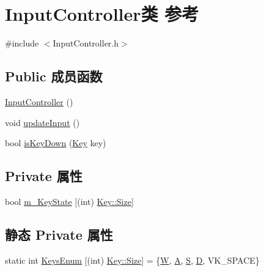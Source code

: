 \hypertarget{class_input_controller}{}\section{Input\+Controller类 参考}
\label{class_input_controller}


{\ttfamily \#include $<$Input\+Controller.\+h$>$}

\subsection*{Public 成员函数}
\begin{DoxyCompactItemize}
\item 
\hyperlink{class_input_controller_aba927fffeb0bf4c4fd0835d4dfbdfaec}{Input\+Controller} ()
\item 
void \hyperlink{class_input_controller_a2a88542ae1370cf3f5ace3c4bb8813d9}{update\+Input} ()
\item 
bool \hyperlink{class_input_controller_a7ed265c719c06edf5a7294e98739d932}{is\+Key\+Down} (\hyperlink{_input_controller_8h_ab3c7af4820830f9166ede9e5623c4e73}{Key} key)
\end{DoxyCompactItemize}
\subsection*{Private 属性}
\begin{DoxyCompactItemize}
\item 
bool \hyperlink{class_input_controller_aebe382d8d20e579a3f2c92b58ad53ac3}{m\+\_\+\+Key\+State} \mbox{[}(int) \hyperlink{_input_controller_8h_ab3c7af4820830f9166ede9e5623c4e73a6f6cb72d544962fa333e2e34ce64f719}{Key\+::\+Size}\mbox{]}
\end{DoxyCompactItemize}
\subsection*{静态 Private 属性}
\begin{DoxyCompactItemize}
\item 
static int \hyperlink{class_input_controller_afa9908a71b2107375b9104e51b465b06}{Keys\+Enum} \mbox{[}(int) \hyperlink{_input_controller_8h_ab3c7af4820830f9166ede9e5623c4e73a6f6cb72d544962fa333e2e34ce64f719}{Key\+::\+Size}\mbox{]} = \{\textquotesingle{}\hyperlink{_input_controller_8h_ab3c7af4820830f9166ede9e5623c4e73a61e9c06ea9a85a5088a499df6458d276}{W}\textquotesingle{}, \textquotesingle{}\hyperlink{_input_controller_8h_ab3c7af4820830f9166ede9e5623c4e73a7fc56270e7a70fa81a5935b72eacbe29}{A}\textquotesingle{}, \textquotesingle{}\hyperlink{_input_controller_8h_ab3c7af4820830f9166ede9e5623c4e73a5dbc98dcc983a70728bd082d1a47546e}{S}\textquotesingle{}, \textquotesingle{}\hyperlink{_input_controller_8h_ab3c7af4820830f9166ede9e5623c4e73af623e75af30e62bbd73d6df5b50bb7b5}{D}\textquotesingle{}, V\+K\+\_\+\+S\+P\+A\+CE\}
\end{DoxyCompactItemize}


